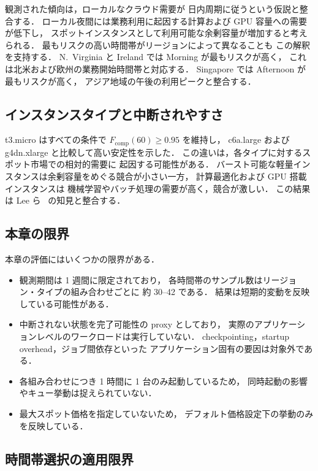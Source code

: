 \documentclass[11pt,a4paper]{ltjsreport}
\newcommand{\Fcomp}{F_{\mathrm{comp}}}
\begin{document}
観測された傾向は，ローカルなクラウド需要が
日内周期に従うという仮説と整合する．
ローカル夜間には業務利用に起因する計算および GPU 容量への需要が低下し，
スポットインスタンスとして利用可能な余剰容量が増加すると考えられる．
最もリスクの高い時間帯がリージョンによって異なることも
この解釈を支持する．
N.~Virginia と Ireland では Morning が最もリスクが高く，
これは北米および欧州の業務開始時間帯と対応する．
Singapore では Afternoon が最もリスクが高く，
アジア地域の午後の利用ピークと整合する．

\subsection{インスタンスタイプと中断されやすさ}

t3.micro はすべての条件で $\Fcomp(60) \geq 0.95$ を維持し，
c6a.large および g4dn.xlarge と比較して高い安定性を示した．
この違いは，各タイプに対するスポット市場での相対的需要に
起因する可能性がある．
バースト可能な軽量インスタンスは余剰容量をめぐる競合が小さい一方，
計算最適化および GPU 搭載インスタンスは
機械学習やバッチ処理の需要が高く，競合が激しい．
この結果は Lee ら~\cite{Lee2022SpotLake} の知見と整合する．

\subsection{本章の限界}
\label{sec:limit_ch4}

本章の評価にはいくつかの限界がある．

\begin{itemize}
  \item 観測期間は 1 週間に限定されており，
        各時間帯のサンプル数はリージョン・タイプの組み合わせごとに
        約 30--42 である．
        結果は短期的変動を反映している可能性がある．
  \item 中断されない状態を完了可能性の proxy としており，
        実際のアプリケーションレベルのワークロードは実行していない．
        checkpointing，startup overhead，ジョブ間依存といった
        アプリケーション固有の要因は対象外である．
  \item 各組み合わせにつき 1 時間に 1 台のみ起動しているため，
        同時起動の影響やキュー挙動は捉えられていない．
  \item 最大スポット価格を指定していないため，
        デフォルト価格設定下の挙動のみを反映している．
\end{itemize}

\subsection{時間帯選択の適用限界}
\label{sec:timeshift_limit}
\end{document}

